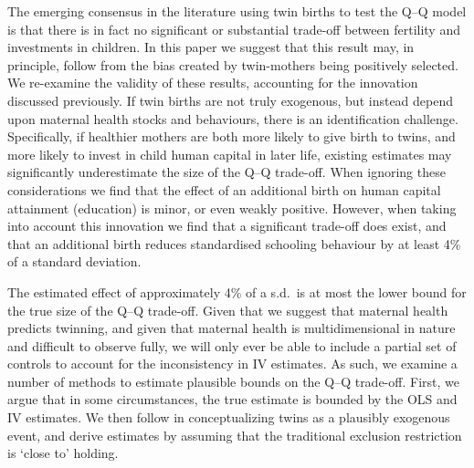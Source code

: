 The emerging consensus in the literature using twin births to test the Q--Q 
model is that there is in fact no significant or substantial trade-off between 
fertility and investments in children. In this paper we suggest that this result 
may, in principle, follow from the bias created by twin-mothers being positively 
selected. We re-examine the validity of these results, accounting for the 
innovation discussed previously.  If twin births are not truly exogenous, but 
instead depend upon maternal health stocks and behaviours, there is an 
identification challenge.  Specifically, if healthier mothers are both more 
likely to give birth to twins, and more likely to invest in child human capital 
in later life, existing estimates may significantly underestimate the size of 
the Q--Q trade-off.  When ignoring these considerations we find that the effect 
of an additional birth on human capital attainment (education) is minor, or even 
weakly positive. However, when taking into account this innovation we find that 
a significant trade-off does exist, and that an additional birth reduces 
standardised schooling behaviour by at least 4\% of a standard deviation.

The estimated effect of approximately 4\% of a s.d.\ is at most the lower bound 
for the true size of the Q--Q trade-off. Given that we suggest that maternal 
health predicts twinning, and given that maternal health is multidimensional in 
nature and difficult to observe fully, we will only ever be able to include a 
partial set of controls to account for the inconsistency in IV estimates. As 
such, we examine a number of methods to estimate plausible bounds on the Q--Q 
trade-off. First, we argue that in some circumstances, the true estimate is 
bounded by the OLS and IV estimates. We then follow \citet{Conleyetal2012} in 
conceptualizing twins as a plausibly exogenous event, and derive estimates by 
assuming that the traditional exclusion restriction is `close to' holding.


